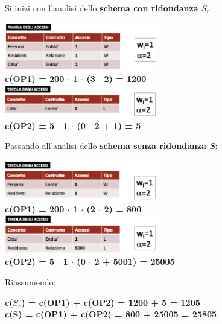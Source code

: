 \documentclass{article}
\begin{document}
Si inizi con l'analisi dello \textbf{schema con ridondanza \textit{$S_r$}}:\\
\begin{center}
    \includegraphics[width=0.5\textwidth]{foto 10.png}\vspace{10pt}\\
    \textbf{c(OP1) = 200 $\cdot$ 1 $\cdot$ (3 $\cdot$ 2) = 1200}\vspace{10pt}\\
    \includegraphics[width=0.5\textwidth]{foto 11.png}\vspace{10pt}\\
    \textbf{c(OP2) = 5 $\cdot$ 1 $\cdot$ (0 $\cdot$ 2 + 1) = 5}
\end{center}
Passando all'analisi dello \textbf{schema senza ridondanza \textit{S}}:\\
\begin{center}
    \includegraphics[width=0.5\textwidth]{foto 12.png}\vspace{10pt}\\
    \textbf{c(OP1) = 200 $\cdot$ 1 $\cdot$ (2 $\cdot$ 2) = 800}\vspace{10pt}\\
    \includegraphics[width=0.5\textwidth]{foto 13.png}\vspace{10pt}\\
    \textbf{c(OP2) = 5 $\cdot$ 1 $\cdot$ (0 $\cdot$ 2 + 5001) = 25005}
\end{center}
Riassumendo:
\begin{center}
    \textbf{c($S_r$) = c(OP1) + c(OP2) = 1200 + 5 = 1205}\vspace{10pt}\\
    \textbf{c(S) = c(OP1) + c(OP2) = 800 + 25005 = 25805}\vspace{30pt}\\
\end{center}
\end{document}
